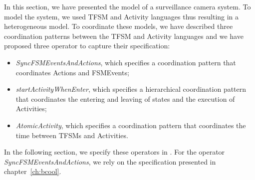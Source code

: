 In this section, we have presented the model of a surveillance camera system. To model the system, we used TFSM and Activity languages thus resulting in a heterogeneous model. To coordinate these models, we have described three coordination patterns between the TFSM and Activity languages and we have proposed three \bcool operator to capture their specification:
	\begin{itemize}
		\item \emph{SyncFSMEventsAndActions}, which specifies a coordination pattern that coordinates Actions and FSMEvents;
		\item \emph{startActivityWhenEnter}, which specifies a hierarchical coordination pattern that coordinates the entering and leaving of states and the execution of Activities; 
		\item \emph{AtomicActivity}, which specifies a coordination pattern that coordinates the time between TFSMs and Activities. 
	\end{itemize}
	
In the following section, we specify these operators in \bcool. For the operator \emph{SyncFSMEventsAndActions}, we rely on the specification presented in chapter~\ref{ch:bcool}. 
